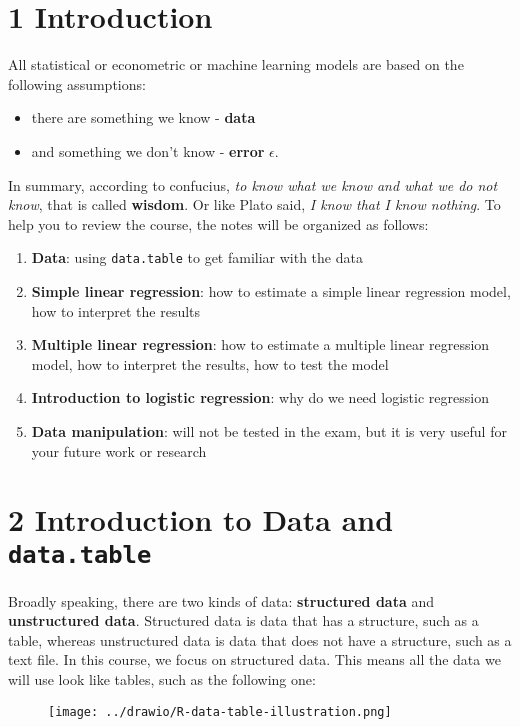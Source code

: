 \documentclass[11pt]{article}
\theoremstyle{definition}
\providecommand{\tightlist}{%
\setlength{\itemsep}{0pt}\setlength{\parskip}{0pt}}
\begin{document}
\vskip -8.5pt


\noindent  

\hypersetup{linkcolor=black}
\setcounter{tocdepth}{3}
\tableofcontents


\newpage
{}
\setcounter{page}{1}
\section{1 Introduction}

All statistical or econometric or machine learning models are based on 
the following assumptions:

\begin{itemize}
\tightlist
\item there are something we know - \textbf{data}
\item and something we don't know - \textbf{error} \(\epsilon\).
\end{itemize}

In summary, according to confucius, \textit{to know what we know and what we do not know}, 
that is called \textbf{wisdom}. Or like Plato said, \textit{I know that I know nothing}.
To help you to review the course, the notes will be organized as follows:

\begin{enumerate}
\tightlist 
  \item \textbf{Data}: using \texttt{data.table} to get familiar with the data
  \item \textbf{Simple linear regression}: how to estimate a simple linear regression model, how to interpret the results
  \item \textbf{Multiple linear regression}: how to estimate a multiple linear regression model, how to interpret the results, how to test the model
  \item \textbf{Introduction to logistic regression}: why do we need logistic regression
  \item \textbf{Data manipulation}: will not be tested in the exam, but it is very useful for your future work or research
\end{enumerate}


\section{2 Introduction to Data and \texttt{data.table}}



Broadly speaking, there are two kinds of data: \textbf{structured data} and 
\textbf{unstructured data}. 
Structured data is data that has a structure, such as a table, 
whereas unstructured data is data that does not have a structure, 
such as a text file. In this course, we focus on structured data. 
This means all the data we will use look like tables, such as the following one:


\begin{figure}
  \centering
  \texttt{[image: ../drawio/R-data-table-illustration.png]}
\end{figure}
\end{document}
